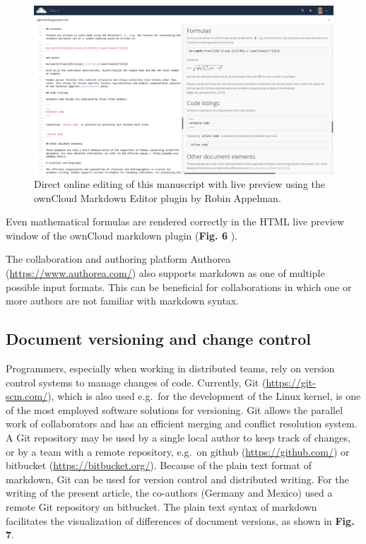 \documentclass[10pt,fleqn]{wlpeerj}
\begin{document}
\begin{figure}[htbp]
\centering
\includegraphics{Fig6.png}
\caption{Direct online editing of this manuscript with live preview
using the ownCloud Markdown Editor plugin by Robin Appelman.}
\end{figure}

Even mathematical formulas are rendered correctly in the HTML live
preview window of the ownCloud markdown plugin (\textbf{Fig. 6} ).

The collaboration and authoring platform Authorea
(\url{https://www.authorea.com/}) also supports markdown as one of
multiple possible input formats. This can be beneficial for
collaborations in which one or more authors are not familiar with
markdown syntax.

\subsection{Document versioning and change
control}\label{document-versioning-and-change-control}

Programmers, especially when working in distributed teams, rely on
version control systems to manage changes of code. Currently, Git
(\url{https://git-scm.com/}), which is also used e.g.~for the
development of the Linux kernel, is one of the most employed software
solutions for versioning. Git allows the parallel work of collaborators
and has an efficient merging and conflict resolution system. A Git
repository may be used by a single local author to keep track of
changes, or by a team with a remote repository, e.g.~on github
(\url{https://github.com/}) or bitbucket (\url{https://bitbucket.org/}).
Because of the plain text format of markdown, Git can be used for
version control and distributed writing. For the writing of the present
article, the co-authors (Germany and Mexico) used a remote Git
repository on bitbucket. The plain text syntax of markdown facilitates
the visualization of differences of document versions, as shown in
\textbf{Fig. 7}.
\end{document}
